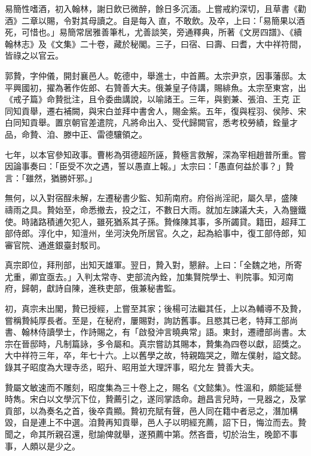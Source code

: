\begin{pinyinscope}
 易簡性嗜酒，初入翰林，謝日飲已微醉，餘日多沉湎。上嘗戒約深切，且草書《勸酒》二章以賜，令對其母讀之。自是每入
 直，不敢飲。及卒，上曰：「易簡果以酒死，可惜也。」易簡常居雅善筆札，尤善談笑，旁通釋典，所著《文房四譜》、《續翰林志》及《文集》二十卷，藏於秘閣。三子，曰宿、曰壽、曰耆，大中祥符間，皆祿之以官云。



 郭贄，字仲儀，開封襄邑人。乾德中，舉進士，中首薦。太宗尹京，因事藩邸。太平興國初，擢為著作佐郎、右贊善大夫。俄兼皇子侍講，賜緋魚。太宗至東宮，出《戒子篇》命贄批注，且令委曲講說，以喻諸王。三年，與劉兼、張洎、王克
 正同知貢舉，遷右補闕，與宋白並拜中書舍人，賜金紫。五年，復與程羽、侯陟、宋白同知貢舉。置京朝官差遣院，凡將命出入、受代歸闕官，悉考校勞績，銓量才品，命贄、洎、滕中正、雷德驤領之。



 七年，以本官參知政事。曹彬為弭德超所誣，贄極言救解，深為宰相趙普所重。嘗因論事奏曰：「臣受不次之遇，誓以愚直上報。」太宗曰：「愚直何益於事？」贄言：「雖然，猶勝奸邪。」



 無何，以入對宿酲未解，左遷秘書少監、知荊南府。府俗尚淫祀，屬久旱，盛陳
 禱雨之具。贄始至，命悉撤去，投之江，不數日大雨。就加左諫議大夫，入為鹽鐵使。時諸路積逋欠犯人，雖死猶系其子孫。贄條陳其事，多所蠲貸。籍田，超拜工部侍郎。淳化中，知澶州，坐河決免所居官。久之，起為給事中，復工部侍郎，知審官院、通進銀臺封駁司。



 真宗即位，拜刑部，出知天雄軍。翌日，贄入對，懇辭。上曰：「全魏之地，所寄尤重，卿宜亟去。」入判太常寺、吏部流內銓，加集賢院學士、判院事。知河南府，歸朝，獻詩自陳，進秩吏部，俄兼秘書監。



 初，真宗未出閣，贄已授經，上嘗至其家；後楊可法繼其任，上以為輔導不及贄，嘗稱贄純厚長者。至是，在秘府，屢賜對，詢訪舊事。且愍其已老，特拜工部尚書、翰林侍讀學士，作詩賜之，有「啟發沖言曉典常」語。東封，遷禮部尚書。太宗在晉邸時，凡制篇詠，多令屬和。真宗嘗訪其賜本，贄集為四卷以獻，詔獎之。大中祥符三年，卒，年七十六。上以舊學之故，特親臨哭之，贈左僕射，謚文懿。錄其子昭度為大理寺丞，昭升、昭用並大理評事，昭允左
 贊善大夫。



 贄屬文敏速而不雕刻，昭度集為三十卷上之，賜名《文懿集》。性溫和，頗能延譽時雋。宋白以文學沉下位，贄薦引之，遂同掌誥命。趙昌言兒時，一見器之，及掌貢部，以為奏名之首，後卒貴顯。贄初充賦有聲，邑人同在籍中者忌之，潛加構毀，自是連上不中選。洎贄再知貢舉，邑人子以明經充薦，詔下日，悔泣而去。贄聞之，命其所親召還，慰諭俾就舉，遂預薦中第。然吝嗇，切於治生，晚節不事事，人頗以是少之。




\end{pinyinscope}
